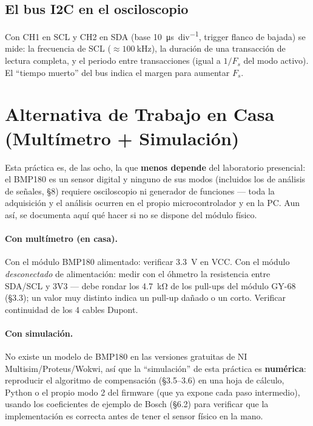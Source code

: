 \documentclass[11pt]{article}
\begin{document}
\subsection{El bus I2C en el osciloscopio}
Con CH1 en SCL y CH2 en SDA (base \SI{10}{\micro\second\per div}, trigger flanco de
bajada) se mide: la frecuencia de SCL ($\approx\SI{100}{\kilo\hertz}$), la duración de
una transacción de lectura completa, y el periodo entre transacciones (igual a $1/F_s$
del modo activo). El ``tiempo muerto'' del bus indica el margen para aumentar $F_s$.

\section{Alternativa de Trabajo en Casa (Multímetro + Simulación)}
\label{sec:casa}

Esta práctica es, de las ocho, la que \textbf{menos depende} del laboratorio presencial:
el BMP180 es un sensor digital y ninguno de sus modos (incluidos los de análisis de
señales, \S8) requiere osciloscopio ni generador de funciones — toda la adquisición y
el análisis ocurren en el propio microcontrolador y en la PC. Aun así, se documenta
aquí qué hacer si no se dispone del módulo físico.

\paragraph{Con multímetro (en casa).} Con el módulo BMP180 alimentado: verificar
\SI{3.3}{\volt} en VCC. Con el módulo \emph{desconectado} de alimentación: medir con el
óhmetro la resistencia entre SDA/SCL y 3V3 — debe rondar los \SI{4.7}{\kilo\ohm} de los
pull-ups del módulo GY-68 (\S3.3); un valor muy distinto indica un pull-up dañado o un
corto. Verificar continuidad de los 4 cables Dupont.

\paragraph{Con simulación.} No existe un modelo de BMP180 en las versiones gratuitas de
NI Multisim/Proteus/Wokwi, así que la ``simulación'' de esta práctica es
\textbf{numérica}: reproducir el algoritmo de compensación (\S3.5–3.6) en una hoja de
cálculo, Python o el propio modo 2 del firmware (que ya expone cada paso intermedio),
usando los coeficientes de ejemplo de Bosch (\S6.2) para verificar que la implementación
es correcta antes de tener el sensor físico en la mano.
\end{document}

